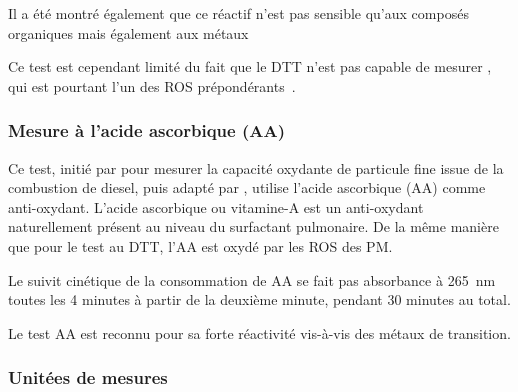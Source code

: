 Il a été montré également que ce réactif n'est pas sensible qu'aux composés organiques
mais également aux métaux~\autocite{charrierDithiothreitol2012,linGeneration2011}

Ce test est cependant limité du fait que le DTT n'est pas capable de mesurer
, qui est pourtant l'un des ROS prépondérants~\autocite{xiongRethinking2017}.

\subsubsection{Mesure à l'acide ascorbique (AA)}%
\label{ssub:mesure_à_l_aa}

Ce test, initié par \textcite{zielinskiModeling1999} pour mesurer la capacité oxydante de
particule fine issue de la combustion de diesel, puis adapté par
\textcite{mudwayVitro2004,ayresEvaluating2008}, utilise l'acide ascorbique (AA) comme
anti-oxydant.
L'acide ascorbique ou vitamine-A est un anti-oxydant naturellement présent au niveau du
surfactant pulmonaire. De la même manière que pour le test au DTT, l'AA est oxydé par
les ROS des PM.

Le suivit cinétique de la consommation de AA se fait pas absorbance à \SI{265}{\nano\m}
toutes les 4 minutes à partir de la deuxième minute, pendant 30 minutes au total.

Le test AA est reconnu pour sa forte réactivité vis-à-vis des métaux de transition. 


%
%
%

\subsubsection{Unitées de mesures}%
\label{ssub:unitees_de_mesures}

